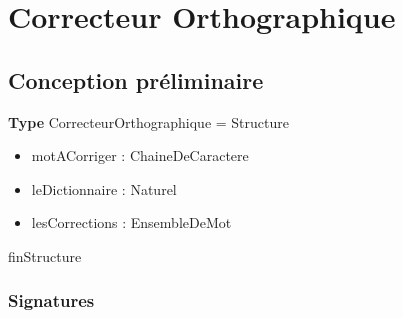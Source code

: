 \documentclass{article}
\begin{document}
    \pagestyle{empty}
    \noindent

    \section*{Correcteur Orthographique}
    
    \subsection*{Conception préliminaire}
    \textbf{Type} CorrecteurOrthographique = Structure
	\begin{itemize}[label=$\ $, leftmargin=2cm]
		 \item motACorriger : ChaineDeCaractere
		 \item leDictionnaire : Naturel
		 \item lesCorrections : EnsembleDeMot
	\end{itemize}
    finStructure
    \subsubsection*{Signatures}
\end{document}
